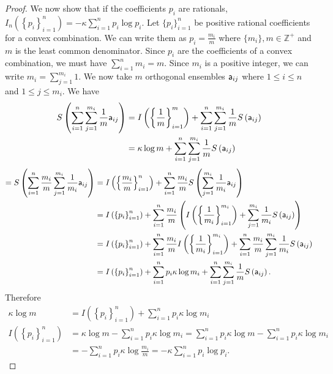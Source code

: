 \begin{mathSection}
\begin{proof}
	We now show that if the coefficients $p_i$ are rationals, $I_n\left(\left\{ p_i\right\}_{i=1}^{n}\right) = - \kappa \sum_{i=1}^{n} p_i \log p_i$. Let $\{p_i\}_{i=1}^{n}$ be positive rational coefficients for a convex combination. We can write them as $p_i = \frac{m_i}{m}$ where $\{m_i\}, m \in \mathbb{Z}^+$ and $m$ is the least common denominator. Since $p_i$ are the coefficients of a convex combination, we must have $\sum_{i=1}^{n} m_i = m$. Since $m_i$ is a positive integer, we can write $m_i = \sum_{j=1}^{m_i} 1$. We now take $m$ orthogonal ensembles $\ens[a]_{ij}$ where $1 \leq i \leq n$ and $1 \leq j \leq m_i$. We have
	\begin{equation}
		\begin{aligned}
			S\left(\sum_{i=1}^{n}\sum_{j=1}^{m_i} \frac{1}{m} \ens[a]_{ij}\right) &= I\left(\left\{ \frac{1}{m}\right\}_{i=1}^{m}\right) + \sum_{i=1}^{n}\sum_{j=1}^{m_i} \frac{1}{m} S\left(\ens[a]_{ij}\right) \\
			&= \kappa \log m + \sum_{i=1}^{n}\sum_{j=1}^{m_i} \frac{1}{m} S\left(\ens[a]_{ij}\right) \\
		\end{aligned}
	\end{equation}
	\begin{equation}
		\begin{aligned}
			= S\left(\sum_{i=1}^{n} \frac{m_i}{m} \sum_{j=1}^{m_i} \frac{1}{m_i} \ens[a]_{ij}\right)  &=I\left(\left\{ \frac{m_i}{m}\right\}_{i=1}^{n}\right) + \sum_{i=1}^{n} \frac{m_i}{m}  S\left(\sum_{j=1}^{m_i} \frac{1}{m_i} \ens[a]_{ij}\right) \\
			&=I\left(\left\{ p_i\right\}_{i=1}^{n}\right) + \sum_{i=1}^{n} \frac{m_i}{m}\left(I\left(\left\{ \frac{1}{m_i}\right\}_{i=1}^{m_i}\right) + \sum_{j=1}^{m_i} \frac{1}{m_i} S\left(\ens[a]_{ij}\right)\right) \\
			&=I\left(\left\{ p_i\right\}_{i=1}^{n}\right) + \sum_{i=1}^{n} \frac{m_i}{m} I\left(\left\{ \frac{1}{m_i}\right\}_{i=1}^{m_i}\right) + \sum_{i=1}^{n} \frac{m_i}{m} \sum_{j=1}^{m_i} \frac{1}{m_i}S\left(\ens[a]_{ij}\right) \\
			&=I\left(\left\{ p_i\right\}_{i=1}^{n}\right) + \sum_{i=1}^{n} p_i \kappa \log m_i + \sum_{i=1}^{n}  \sum_{j=1}^{m_i} \frac{1}{m} S\left(\ens[a]_{ij}\right).
		\end{aligned}
	\end{equation}
	Therefore
	\begin{equation}
		\begin{aligned}
			\kappa \log m &= I\left(\left\{ p_i\right\}_{i=1}^{n}\right) + \sum_{i=1}^{n} p_i \kappa \log m_i \\
			I\left(\left\{ p_i\right\}_{i=1}^{n}\right) &= \kappa \log m - \sum_{i=1}^{n} p_i \kappa \log m_i = \sum_{i=1}^{n} p_i \kappa \log m - \sum_{i=1}^{n} p_i \kappa \log m_i \\
			&= - \sum_{i=1}^{n} p_i \kappa \log \frac{m_i}{m} = - \kappa \sum_{i=1}^{n} p_i \log p_i.
		\end{aligned}
	\end{equation}
	

\end{proof}
\end{mathSection}
